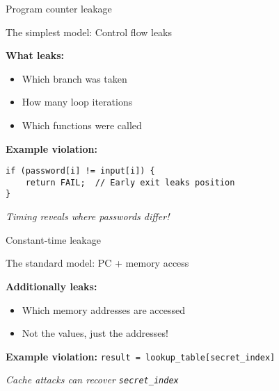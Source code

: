 \documentclass[aspectratio=169, lualatex, handout]{beamer}
\begin{document}
\begin{frame}{Program counter leakage}
	\begin{center}
		\Large
		The simplest model: Control flow leaks
	\end{center}
	\vspace{1em}
	\textbf{What leaks:}
	\begin{itemize}
		\item Which branch was taken
		\item How many loop iterations
		\item Which functions were called
	\end{itemize}
	\vspace{0.5em}
	\textbf{Example violation:}
	\begin{flushleft}
		\texttt{if (password[i] != input[i]) \{}\\
		\texttt{~~~~return FAIL;~~// Early exit leaks position}\\
		\texttt{\}}
	\end{flushleft}
	\vspace{0.5em}
	\begin{center}
		\textit{Timing reveals where passwords differ!}
	\end{center}
\end{frame}

\begin{frame}{Constant-time leakage}
	\begin{center}
		\Large
		The standard model: PC + memory access
	\end{center}
	\vspace{1em}
	\textbf{Additionally leaks:}
	\begin{itemize}
		\item Which memory addresses are accessed
		\item Not the values, just the addresses!
	\end{itemize}
	\vspace{0.5em}
	\textbf{Example violation:} \texttt{result = lookup\_table[secret\_index]}
	\vspace{0.5em}
	\begin{center}
		\textit{Cache attacks can recover \texttt{secret\_index}}
	\end{center}
\end{frame}
\end{document}
